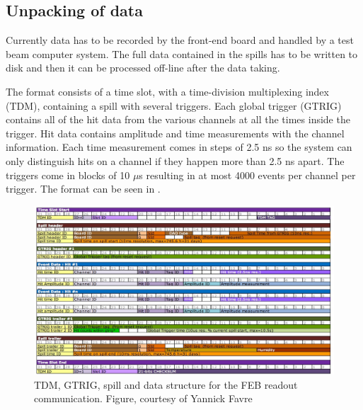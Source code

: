 \subsection{Unpacking of data}


Currently data has to be recorded by the front-end board and handled by a test beam computer system. The full data contained in the spills has to be written to disk and then it can be processed off-line after the data taking.

The format consists of a time slot, with a time-division multiplexing index (TDM), containing a spill with several triggers. Each global trigger (GTRIG) contains all of the hit data from the various channels at all the times inside the trigger. Hit data contains amplitude and time measurements with the channel information.
Each time measurement comes in steps of 2.5 ns so the system can only distinguish hits on a channel if they happen more than 2.5 ns apart. The triggers come in blocks of 10 $\mu$s resulting in at most 4000 events per channel per trigger. The format can be seen in .


\begin{figure}[h!]
\centering
\includegraphics[width=\textwidth]{figures/febstructure.jpeg}
\caption{TDM, GTRIG, spill and data structure for the FEB readout communication. Figure, courtesy of Yannick Favre}
\label{fig:FEBstructure}
\end{figure}



